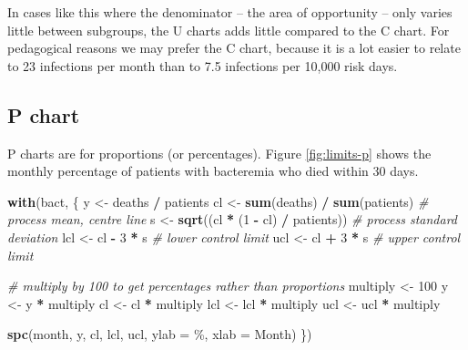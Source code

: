 \documentclass[
]{book}
\newenvironment{Shaded}{\begin{snugshade}}{\end{snugshade}}
\newcommand{\AttributeTok}[1]{\textcolor[rgb]{0.13,0.29,0.53}{#1}}
\newcommand{\CommentTok}[1]{\textcolor[rgb]{0.56,0.35,0.01}{\textit{#1}}}
\newcommand{\DecValTok}[1]{\textcolor[rgb]{0.00,0.00,0.81}{#1}}
\newcommand{\FunctionTok}[1]{\textcolor[rgb]{0.13,0.29,0.53}{\textbf{#1}}}
\newcommand{\NormalTok}[1]{#1}
\newcommand{\OtherTok}[1]{\textcolor[rgb]{0.56,0.35,0.01}{#1}}
\newcommand{\SpecialCharTok}[1]{\textcolor[rgb]{0.81,0.36,0.00}{\textbf{#1}}}
\newcommand{\StringTok}[1]{\textcolor[rgb]{0.31,0.60,0.02}{#1}}
\begin{document}
In cases like this where the denominator -- the area of opportunity -- only varies little between subgroups, the U charts adds little compared to the C chart. For pedagogical reasons we may prefer the C chart, because it is a lot easier to relate to 23 infections per month than to 7.5 infections per 10,000 risk days.

\subsection{P chart}\label{p-chart}

P charts are for proportions (or percentages). Figure \ref{fig:limits-p} shows the monthly percentage of patients with bacteremia who died within 30 days.

\begin{Shaded}
\begin{Highlighting}[]
\FunctionTok{with}\NormalTok{(bact, \{}
\NormalTok{  y   }\OtherTok{\textless{}{-}}\NormalTok{ deaths }\SpecialCharTok{/}\NormalTok{ patients}
\NormalTok{  cl  }\OtherTok{\textless{}{-}} \FunctionTok{sum}\NormalTok{(deaths) }\SpecialCharTok{/} \FunctionTok{sum}\NormalTok{(patients)      }\CommentTok{\# process mean, centre line}
\NormalTok{  s   }\OtherTok{\textless{}{-}} \FunctionTok{sqrt}\NormalTok{((cl }\SpecialCharTok{*}\NormalTok{ (}\DecValTok{1} \SpecialCharTok{{-}}\NormalTok{ cl) }\SpecialCharTok{/}\NormalTok{ patients)) }\CommentTok{\# process standard deviation}
\NormalTok{  lcl }\OtherTok{\textless{}{-}}\NormalTok{ cl }\SpecialCharTok{{-}} \DecValTok{3} \SpecialCharTok{*}\NormalTok{ s                       }\CommentTok{\# lower control limit}
\NormalTok{  ucl }\OtherTok{\textless{}{-}}\NormalTok{ cl }\SpecialCharTok{+} \DecValTok{3} \SpecialCharTok{*}\NormalTok{ s                       }\CommentTok{\# upper control limit}
  
  \CommentTok{\# multiply by 100 to get percentages rather than proportions}
\NormalTok{  multiply }\OtherTok{\textless{}{-}} \DecValTok{100}
\NormalTok{  y        }\OtherTok{\textless{}{-}}\NormalTok{ y }\SpecialCharTok{*}\NormalTok{ multiply}
\NormalTok{  cl       }\OtherTok{\textless{}{-}}\NormalTok{ cl }\SpecialCharTok{*}\NormalTok{ multiply}
\NormalTok{  lcl      }\OtherTok{\textless{}{-}}\NormalTok{ lcl }\SpecialCharTok{*}\NormalTok{ multiply}
\NormalTok{  ucl      }\OtherTok{\textless{}{-}}\NormalTok{ ucl }\SpecialCharTok{*}\NormalTok{ multiply}
  
  \FunctionTok{spc}\NormalTok{(month, y, cl, lcl, ucl, }
      \AttributeTok{ylab =} \StringTok{\textquotesingle{}\%\textquotesingle{}}\NormalTok{, }
      \AttributeTok{xlab =} \StringTok{\textquotesingle{}Month\textquotesingle{}}\NormalTok{)}
\NormalTok{\})}
\end{Highlighting}
\end{Shaded}
\end{document}

